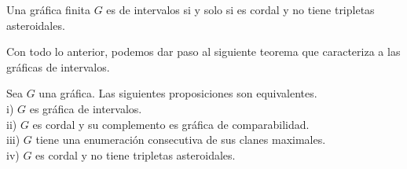 \begin{teorema}
    \label{teo:Int-Ast-free}
    Una gráfica finita $G$ es de intervalos si y solo si es cordal y no tiene
    tripletas asteroidales.
\end{teorema}

Con todo lo anterior, podemos dar paso al siguiente teorema que caracteriza a
las gráficas de intervalos.

\begin{teorema}
\label{teo:CarGrfsInt}
    Sea $G $ una gráfica. Las siguientes proposiciones son equivalentes.\\
    i) $G$ es gráfica de intervalos.\\
    ii) $G$ es cordal y su complemento es gráfica de comparabilidad.\\
    iii) $G$ tiene una enumeración consecutiva de sus clanes maximales.\\
    iv) $G$ es cordal y no tiene tripletas asteroidales. 
\end{teorema}


